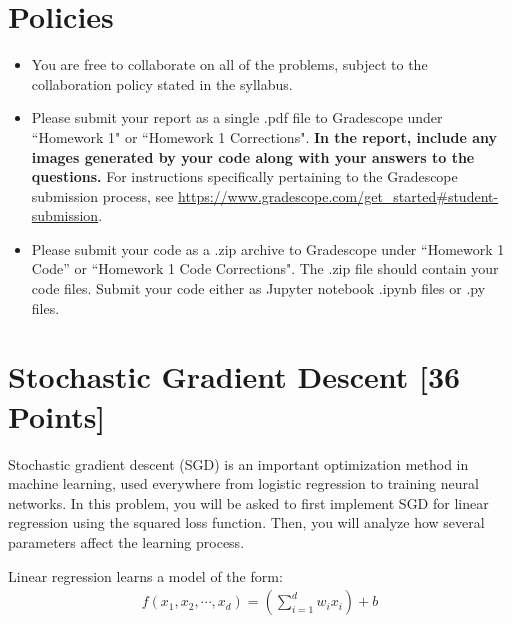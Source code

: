\newif\ifshowsolutions
\showsolutionsfalse




\pagestyle{fancy}

\section*{Policies}
\begin{itemize}
	\item You are free to collaborate on all of the problems, subject to the collaboration policy stated in the syllabus.
	\item Please submit your report as a single .pdf file to Gradescope under ``Homework 1" or ``Homework 1 Corrections".
	      \textbf{In the report, include any images generated by your code along with your answers to the questions.}
	      For instructions specifically pertaining to the Gradescope submission process, see \url{https://www.gradescope.com/get_started#student-submission}.
	\item Please submit your code as a .zip archive to Gradescope under ``Homework 1 Code'' or ``Homework 1 Code Corrections".
	      The .zip file should contain your code files.
	      Submit your code either as Jupyter notebook .ipynb files or .py files.
\end{itemize}

\newpage
\section{Stochastic Gradient Descent [36 Points]}

Stochastic gradient descent (SGD) is an important optimization method in machine learning, used everywhere from logistic regression to training neural networks.
In this problem, you will be asked to first implement SGD for linear regression using the squared loss function.
Then, you will analyze how several parameters affect the learning process.

Linear regression learns a model of the form:
\begin{align*}
	f(x_1, x_2, \cdots, x_d) = \left(\sum_{i=1}^d w_i x_i\right) + b
\end{align*}

